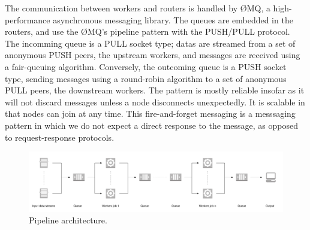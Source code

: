 The communication between workers and routers is handled by ØMQ, a high-performance asynchronous messaging library\cite{zero_mq}.
The queues are embedded in the routers, and use the ØMQ's pipeline pattern with the PUSH/PULL protocol\cite{zero_mq:pipeline}.
The incomming queue is a PULL socket type; datas are streamed from a set of anonymous PUSH peers, the upstream workers, and messages are received using a fair-queuing algorithm.
Conversely, the outcoming queue is a PUSH socket type, sending messages using a round-robin algorithm to a set of anonymous PULL peers, the downstream workers.
The pattern is mostly reliable insofar as it will not discard messages unless a node disconnects unexpectedly.
It is scalable in that nodes can join at any time.
This fire-and-forget messaging is a messsaging pattern in which we do not expect a direct response to the message, as opposed to request-response protocols\cite{voelter_patterns_2003}.

\begin{figure}
  \centering
  \includegraphics[width=.99\textwidth]{images/architecture_pipeline}
  \caption{Pipeline architecture.}
  \label{fig:architecture_pipeline}
\end{figure}
